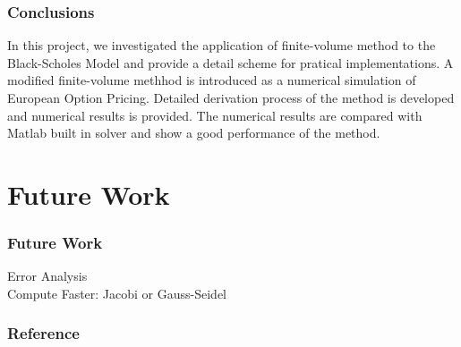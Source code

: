 \documentclass[blue]{beamer}
\begin{document}
\begin{frame}

\frametitle{Conclusions}

In this project, we investigated the application of finite-volume method to the Black-Scholes Model and provide a detail scheme for pratical implementations. A modified finite-volume methhod is introduced as a numerical simulation of European Option Pricing. Detailed derivation process of the method is developed and numerical results is provided. The numerical results are compared with Matlab built in solver and show a good performance of the method. 

\end{frame}

\section{Future Work}
\begin{frame}

\frametitle{Future Work}

Error Analysis\\
Compute Faster: Jacobi or Gauss-Seidel\\

\end{frame}


\appendix

\begin{frame}
\frametitle{Reference}
\nocite{*}		%
\end{frame}
\end{document}
